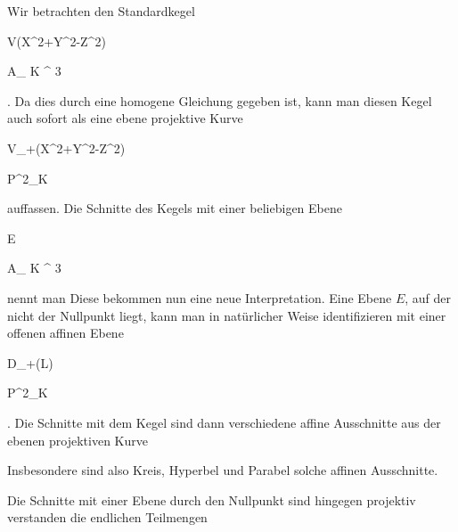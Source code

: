{


Wir betrachten den Standardkegel


\mavergleichskettedisp

{\vergleichskette

{ V(X^2+Y^2-Z^2)
}

{ \subset} { { {\mathbb A}_{ K }^{  3   } }
}

{ } {
}

{ } {
}

{ } {
}

}
{}{}{.}
Da dies durch eine homogene Gleichung gegeben ist, kann man diesen Kegel auch sofort als eine ebene projektive Kurve
 {} {}


\mavergleichskettedisp

{\vergleichskette

{ V_+(X^2+Y^2-Z^2)
}

{ \subset} { {\mathbb P}^{2}_{K}
}

{ } {
}

{ } {
}

{ } {
}

}
{}{}{}
auffassen. Die Schnitte des Kegels mit einer beliebigen Ebene


\mavergleichskette

{\vergleichskette

{E
}

{ \subset }{ { {\mathbb A}_{ K }^{  3   } }
}

{  }{
}

{    }{
}

{   }{
}

}
{}{}{}
nennt man
Diese bekommen nun eine neue Interpretation. Eine Ebene $E$, auf der nicht der Nullpunkt liegt, kann man in natürlicher Weise identifizieren mit einer offenen affinen Ebene


\mavergleichskette

{\vergleichskette

{ D_+(L)
}

{ \subseteq }{ {\mathbb P}^{2}_{K}
}

{  }{
}

{    }{
}

{   }{
}

}
{}{}{}
 {} {.}
Die Schnitte mit dem Kegel sind dann verschiedene affine Ausschnitte aus der ebenen projektiven Kurve

 Insbesondere sind also Kreis, Hyperbel und Parabel solche affinen Ausschnitte.


Die Schnitte mit einer Ebene durch den Nullpunkt sind hingegen projektiv verstanden die endlichen Teilmengen



}


